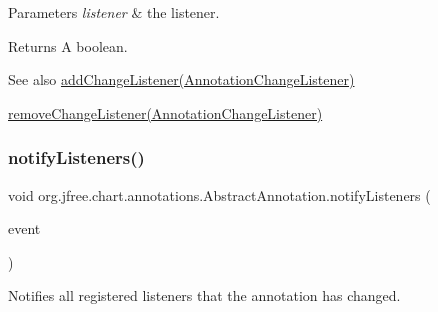 \begin{DoxyParams}{Parameters}
{\em listener} & the listener.\\
\hline
\end{DoxyParams}
\begin{DoxyReturn}{Returns}
A boolean.
\end{DoxyReturn}
\begin{DoxySeeAlso}{See also}
\mbox{\hyperlink{classorg_1_1jfree_1_1chart_1_1annotations_1_1_abstract_annotation_a142d8df764f22560ce23ae44bdc9f4a6}{add\+Change\+Listener(\+Annotation\+Change\+Listener)}} 

\mbox{\hyperlink{classorg_1_1jfree_1_1chart_1_1annotations_1_1_abstract_annotation_a35d547ca28248732aa2a7935ab41f33e}{remove\+Change\+Listener(\+Annotation\+Change\+Listener)}} 
\end{DoxySeeAlso}
\mbox{\label{classorg_1_1jfree_1_1chart_1_1annotations_1_1_abstract_annotation_aa37a4f29e432fc32fcfb72b407505f30}} 
\subsubsection{\texorpdfstring{notify\+Listeners()}{notifyListeners()}}
{\footnotesize\ttfamily void org.\+jfree.\+chart.\+annotations.\+Abstract\+Annotation.\+notify\+Listeners (\begin{DoxyParamCaption}\item[{\mbox{\hyperlink{classorg_1_1jfree_1_1chart_1_1event_1_1_annotation_change_event}{Annotation\+Change\+Event}}}]{event }\end{DoxyParamCaption})\hspace{0.3cm}{\ttfamily [protected]}}

Notifies all registered listeners that the annotation has changed.


